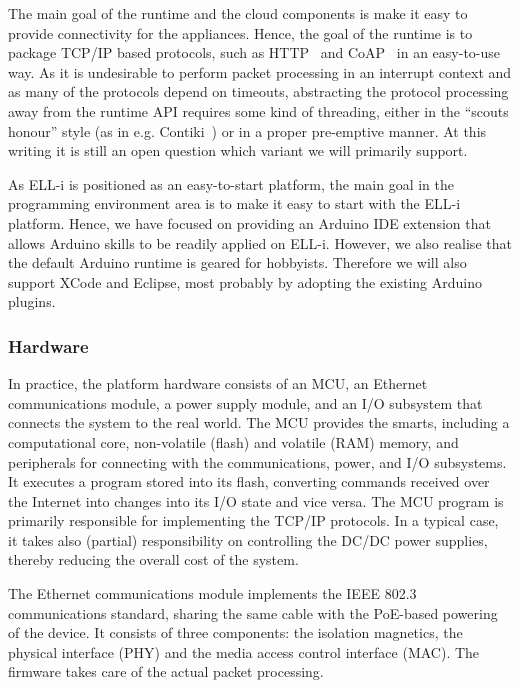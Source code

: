 \documentclass[final]{siamltex}
\begin{document}
The main goal of the runtime and the cloud components is make it easy
to provide connectivity for the appliances.  Hence, the goal of the
runtime is to package TCP/IP based protocols, such as HTTP~\cite{fielding1999hypertext}
and CoAP~\cite{shelby2013constrained} in an easy-to-use way.  As it is undesirable to
perform packet processing in an interrupt context and as many of the
protocols depend on timeouts, abstracting the protocol processing away
from the runtime API requires some kind of threading, either in the
``scouts honour'' style (as in e.g. Contiki~\cite{dunkels2004contiki})
or in a proper pre-emptive manner.  At this writing it is still an
open question which variant we will primarily support.

As ELL-i is positioned as an easy-to-start platform, the main goal in
the programming environment area is to make it easy to start with the
ELL-i platform.  Hence, we have focused on providing an Arduino IDE
extension that allows Arduino skills to be readily applied on ELL-i.
However, we also realise that the default Arduino runtime is geared
for hobbyists.  Therefore we will also support XCode and Eclipse, most
probably by adopting the existing Arduino plugins.

\subsubsection{Hardware}

In practice, the platform hardware consists of an MCU, an Ethernet
communications module, a power supply module, and an I/O subsystem
that connects the system to the real world.  The MCU provides the
smarts, including a computational core, non-volatile (flash) and
volatile (RAM) memory, and peripherals for connecting with the
communications, power, and I/O subsystems.  It executes a program
stored into its flash, converting commands received over the Internet
into changes into its I/O state and vice versa.  The MCU program is
primarily responsible for implementing the TCP/IP protocols.  In a
typical case, it takes also (partial) responsibility on controlling
the DC/DC power supplies, thereby reducing the overall cost of the
system.

The Ethernet communications module implements the IEEE 802.3~\cite{802.3}
communications standard, sharing the same cable with the PoE-based
powering of the device.  It consists of three components: the
isolation magnetics, the physical interface (PHY) and the media access
control interface (MAC).  The firmware takes care of the actual packet
processing.
\end{document}
